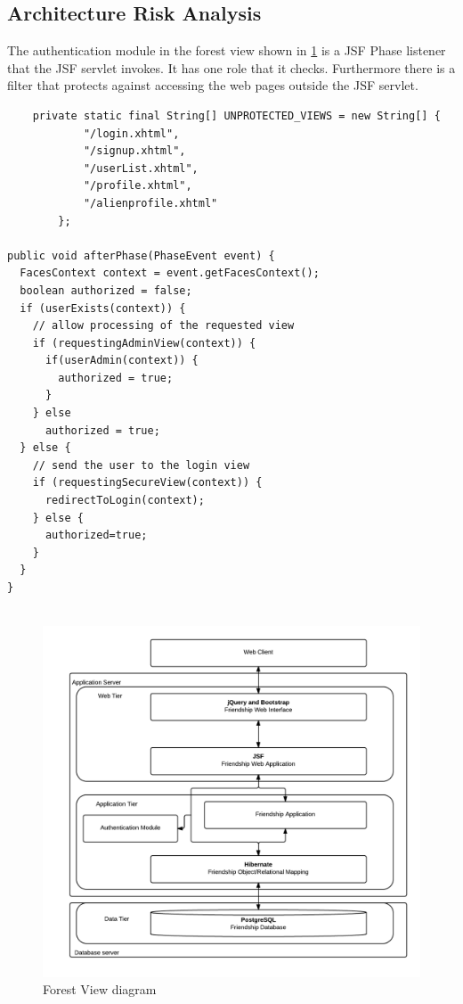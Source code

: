 \documentclass[a4paper]{article}
\begin{document}
\subsection{Architecture Risk Analysis}
The authentication module in the forest view shown in \ref{fig:forest_view} is a JSF Phase listener that the JSF servlet invokes. It has one role that it checks.
Furthermore there is a filter that protects against accessing the web pages outside the JSF servlet.

\begin{lstlisting}  
    private static final String[] UNPROTECTED_VIEWS = new String[] {
            "/login.xhtml",
            "/signup.xhtml",
            "/userList.xhtml",
            "/profile.xhtml",
            "/alienprofile.xhtml"
        };

public void afterPhase(PhaseEvent event) {
  FacesContext context = event.getFacesContext();  
  boolean authorized = false;
  if (userExists(context)) {
    // allow processing of the requested view
    if (requestingAdminView(context)) {
      if(userAdmin(context)) {
        authorized = true; 
      }                     
    } else 
      authorized = true;
  } else {            
    // send the user to the login view
    if (requestingSecureView(context)) {                
      redirectToLogin(context);
    } else {
      authorized=true;
    }
  }
}
        
\end{lstlisting}


\begin{figure}[h!]
\centering
\includegraphics[scale=0.3]{ForestView}
\caption{Forest View diagram}
\label{fig:forest_view}
\end{figure}
\end{document}
